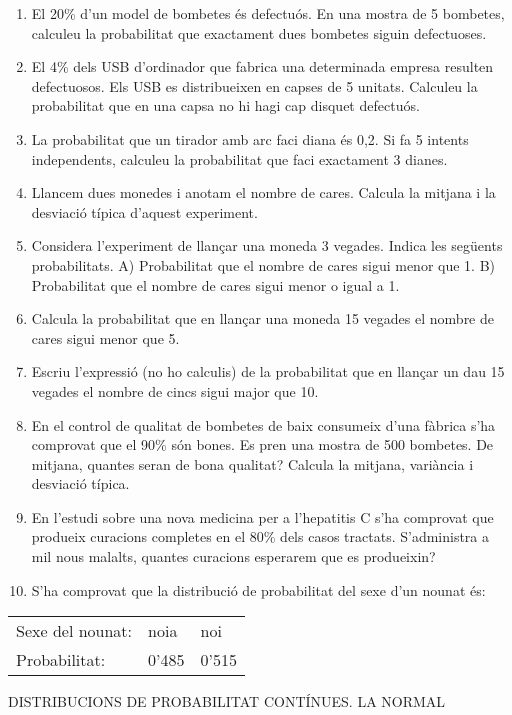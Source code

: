 \begin{enumerate}
\item
  El 20\% d'un model de bombetes és defectuós. En una mostra de 5
  bombetes, calculeu la probabilitat que exactament dues bombetes siguin
  defectuoses. 
\item
  El 4\% dels USB d'ordinador que fabrica una determinada empresa
  resulten defectuosos. Els USB es distribueixen en capses de 5 unitats.
  Calculeu la probabilitat que en una capsa no hi hagi cap disquet
  defectuós. 
\item
  La probabilitat que un tirador amb arc faci diana és 0,2. Si fa 5
  intents independents, calculeu la probabilitat que faci exactament 3
  dianes. 
\item
  Llancem dues monedes i anotam el nombre de cares. Calcula la mitjana i
  la desviació típica d'aquest experiment.
\item
  Considera l'experiment de llançar una moneda 3 vegades. Indica les
  següents probabilitats. A) Probabilitat que el nombre de cares sigui
  menor que 1. B) Probabilitat que el nombre de cares sigui menor o
  igual a 1. 
\item
  Calcula la probabilitat que en llançar una moneda 15 vegades el nombre
  de cares sigui menor que 5.
\item
  Escriu l'expressió (no ho calculis) de la probabilitat que en llançar
  un dau 15 vegades el nombre de cincs sigui major que 10.
\item
  En el control de qualitat de bombetes de baix consumeix d'una fàbrica
  s'ha comprovat que el 90\% són bones. Es pren una mostra de 500
  bombetes. De mitjana, quantes seran de bona qualitat? Calcula la
  mitjana, variància i desviació típica. 
\item
  En l'estudi sobre una nova medicina per a l'hepatitis C s'ha comprovat
  que produeix curacions completes en el 80\% dels casos tractats.
  S'administra a mil nous malalts, quantes curacions esperarem que es
  produeixin?
\item
  S'ha comprovat que la distribució de probabilitat del sexe d'un nounat
  és:
\end{enumerate}

\begin{longtable}[]{@{}lll@{}}
\toprule
Sexe del nounat: & noia & noi\tabularnewline
Probabilitat: & 0'485 & 0'515\tabularnewline
\bottomrule
\end{longtable}

DISTRIBUCIONS DE PROBABILITAT CONTÍNUES. LA NORMAL

